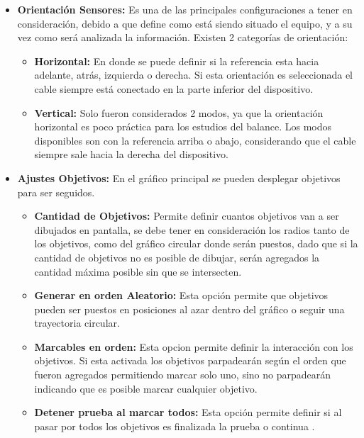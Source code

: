 \documentclass[12pt,a4paper]{article}
\begin{document}
\begin{itemize}
	\item \textbf{Orientación Sensores:} Es una de las principales configuraciones a tener en consideración, debido a que define como está siendo situado el equipo, y a su vez como será analizada la información.
	Existen 2 categorías de orientación:
	\begin{itemize}
		\item \textbf{Horizontal:} En donde se puede definir si la referencia esta hacia adelante, atrás, izquierda o derecha. Si esta orientación es seleccionada el cable siempre está conectado en la parte inferior del dispositivo.
		\item \textbf{Vertical:} Solo fueron considerados 2 modos, ya que  la orientación horizontal es poco práctica para los estudios del balance.
		Los modos disponibles son con la referencia arriba o abajo, considerando que el cable siempre sale hacia la derecha del dispositivo.
	\end{itemize}
	\item \textbf{Ajustes Objetivos:} En el gráfico principal se pueden desplegar objetivos para ser seguidos.
	\begin{itemize}
		\item \textbf{Cantidad de Objetivos:} Permite definir cuantos objetivos van a ser dibujados en pantalla, se debe tener en consideración los radios tanto de los objetivos, como del gráfico circular donde serán puestos, dado que si la cantidad de objetivos no es posible de dibujar, serán agregados la cantidad máxima posible sin que se intersecten.
		\item \textbf{Generar en orden Aleatorio:} Esta opción permite que objetivos pueden ser puestos en posiciones al azar dentro del gráfico o seguir una trayectoria circular.
		\item \textbf{Marcables en orden:} Esta opcion permite definir la interacción con los objetivos.
		Si esta activada los objetivos parpadearán según el orden que fueron agregados permitiendo marcar solo uno, sino no parpadearán indicando que es posible marcar cualquier objetivo.
		\item \textbf{Detener prueba al marcar todos:} Esta opción permite definir si al pasar por todos los objetivos es finalizada la prueba o continua .
	\end{itemize}
	

\end{itemize}
\end{document}
